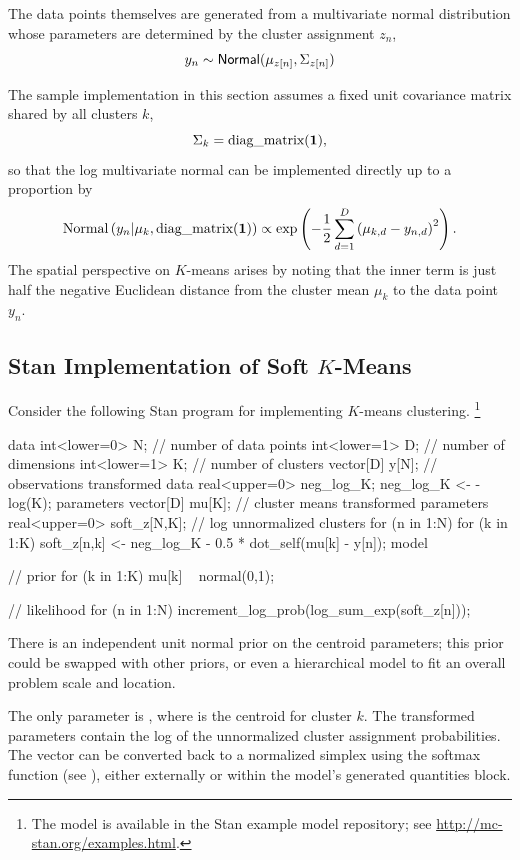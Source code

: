 The data points themselves are generated from a multivariate normal
distribution whose parameters are determined by the cluster assignment
$z_n$,
\[
y_n \sim  \distro{Normal}(\mu_{z[n]},\Sigma_{z[n]})
\]

The sample implementation in this section assumes a fixed unit
covariance matrix shared by all clusters $k$,
\[
\Sigma_k = \mbox{diag\_matrix}({\bf 1}),
\]
so that the log multivariate normal can be implemented directly up to a proportion
by
\[
\mbox{Normal}\left( y_n | \mu_k, \mbox{diag\_matrix}({\bf 1}) \right)
\propto \exp \left (- \frac{1}{2} \sum_{d=1}^D \left( \mu_{k,d} - y_{n,d}
  \right)^2 \right).
\]
The spatial perspective on $K$-means arises by noting that the inner
term is just half the negative Euclidean distance from the cluster
mean $\mu_k$ to the data point $y_n$.

\subsection{Stan Implementation of Soft $K$-Means}

Consider the following Stan program for implementing $K$-means
clustering.%
%
\footnote{The model is available in the Stan example model repository;
see \url{http://mc-stan.org/examples.html}.}
%
\begin{stancode}
data {
  int<lower=0> N;  // number of data points
  int<lower=1> D;  // number of dimensions
  int<lower=1> K;  // number of clusters
  vector[D] y[N];  // observations
}
transformed data {
  real<upper=0> neg_log_K;
  neg_log_K <- -log(K);
}
parameters {
  vector[D] mu[K]; // cluster means
}
transformed parameters {
  real<upper=0> soft_z[N,K]; // log unnormalized clusters
  for (n in 1:N)
    for (k in 1:K)
      soft_z[n,k] <- neg_log_K 
                     - 0.5 * dot_self(mu[k] - y[n]);
}
model {
  // prior
  for (k in 1:K)
    mu[k] ~ normal(0,1);

  // likelihood
  for (n in 1:N)
    increment_log_prob(log_sum_exp(soft_z[n])); 
}
\end{stancode}
%
There is an independent unit normal prior on the centroid parameters;
this prior could be swapped with other priors, or even a hierarchical
model to fit an overall problem scale and location.

The only parameter is , where  is the centroid
for cluster $k$.  The transformed parameters  contain
the log of the unnormalized cluster assignment probabilities.  The
vector  can be converted back to a normalized simplex
using the softmax function (see ), either
externally or within the model's generated quantities block.

